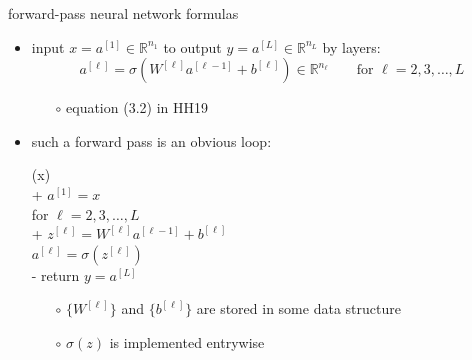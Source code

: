 \documentclass[xcolor={svgnames},
               hyperref={colorlinks,citecolor=DeepPink4,linkcolor=FireBrick,urlcolor=Maroon}]
               {beamer}
\newcommand{\RR}{\mathbb{R}}
\begin{document}
\begin{frame}{forward-pass neural network formulas}

\begin{itemize}
\item input $x = a^{[1]} \in \RR^{n_1}$ to output $y = a^{[L]} \in \RR^{n_L}$ by layers:
    $$a^{[\ell]} = \sigma\left(W^{[\ell]} a^{[\ell-1]} + b^{[\ell]}\right) \in \RR^{n_\ell} \qquad \text{for } \ell=2,3,\dots,L$$

    \begin{itemize}
    \item[$\circ$] equation (3.2) in HH19
    \end{itemize}
\item such a forward pass is an obvious loop:

\begin{pseudo*}
(x)\text{:} \\+
    $a^{[1]} = x$ \\
    for $\ell = 2,3,\dots,L$ \\+
        $z^{[\ell]} = W^{[\ell]} a^{[\ell-1]} + b^{[\ell]}$ \\
        $a^{[\ell]} = \sigma\left(z^{[\ell]}\right)$ \\-
    return $y=a^{[L]}$
\end{pseudo*}

    \begin{itemize}
    \item[$\circ$] $\{W^{[\ell]}\}$ and $\{b^{[\ell]}\}$ are stored in some data structure
    \item[$\circ$] $\sigma(z)$ is implemented entrywise
    \end{itemize}
\end{itemize}
\end{frame}
\end{document}
